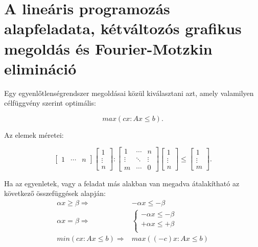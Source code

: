 \skiptooddpage%
\section[A lineáris programozás alapfeladata]{A lineáris programozás
  alapfeladata, kétváltozós grafikus megoldás és Fourier-Motzkin elimináció}

Egy egyenlőtlenségrendszer megoldásai közül kiválasztani azt, amely valamilyen
célfüggvény szerint optimális:

\begin{displaymath}
	max(cx: Ax \leq b).
\end{displaymath}

Az elemek méretei:

\begin{displaymath}
	\begin{bmatrix} 1 &  \cdots &  n \end{bmatrix}
	\begin{bmatrix} 1 \\ \vdots \\  n \end{bmatrix}
	:
	\begin{bmatrix} 1 & \cdots & n \\ \vdots & \ddots & \vdots \\ m  & \cdots & 0 \end{bmatrix}
	\begin{bmatrix} 1 \\ \vdots \\  n \end{bmatrix}
	\leq
	\begin{bmatrix} 1 \\ \vdots \\  m \end{bmatrix}.
\end{displaymath}

Ha az egyenletek, vagy a feladat más alakban van megadva átalakítható az
következő összefüggések alapján:
\begin{align*}
	\alpha x \geq \beta  \Rightarrow & -\alpha x \leq -\beta \\
	\alpha x  =    \beta \Rightarrow & \begin{cases}
		                                   -\alpha x \leq-\beta \\
		                                   +\alpha x \leq+\beta \\
	                                   \end{cases} \\
	min(cx:Ax \leq b)	 \Rightarrow   & max((-c)x:Ax \leq b)
\end{align*}

